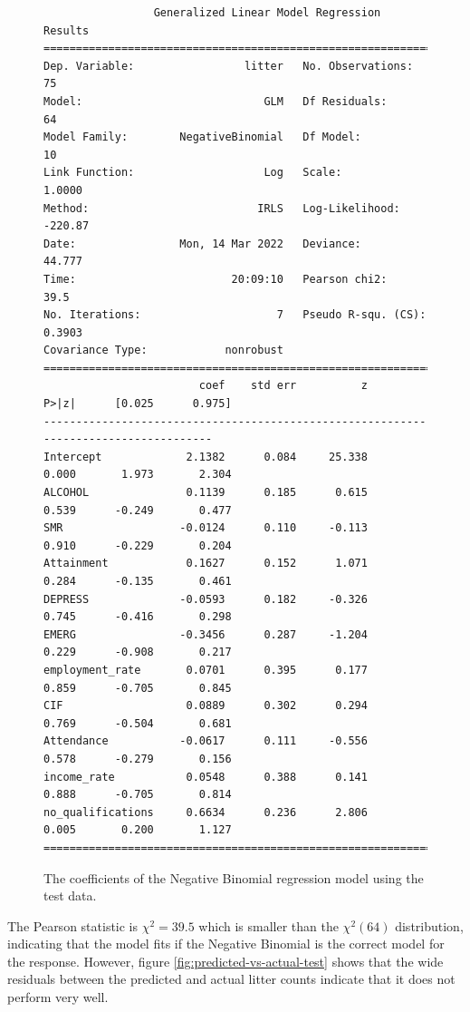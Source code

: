 \documentclass{thesis}
\begin{document}
\begin{figure}[h]
    \centering
\footnotesize
\begin{verbatim}
                 Generalized Linear Model Regression Results                  
==============================================================================
Dep. Variable:                 litter   No. Observations:                   75
Model:                            GLM   Df Residuals:                       64
Model Family:        NegativeBinomial   Df Model:                           10
Link Function:                    Log   Scale:                          1.0000
Method:                          IRLS   Log-Likelihood:                -220.87
Date:                Mon, 14 Mar 2022   Deviance:                       44.777
Time:                        20:09:10   Pearson chi2:                     39.5
No. Iterations:                     7   Pseudo R-squ. (CS):             0.3903
Covariance Type:            nonrobust                                         
=====================================================================================
                        coef    std err          z      P>|z|      [0.025      0.975]
-------------------------------------------------------------------------------------
Intercept             2.1382      0.084     25.338      0.000       1.973       2.304
ALCOHOL               0.1139      0.185      0.615      0.539      -0.249       0.477
SMR                  -0.0124      0.110     -0.113      0.910      -0.229       0.204
Attainment            0.1627      0.152      1.071      0.284      -0.135       0.461
DEPRESS              -0.0593      0.182     -0.326      0.745      -0.416       0.298
EMERG                -0.3456      0.287     -1.204      0.229      -0.908       0.217
employment_rate       0.0701      0.395      0.177      0.859      -0.705       0.845
CIF                   0.0889      0.302      0.294      0.769      -0.504       0.681
Attendance           -0.0617      0.111     -0.556      0.578      -0.279       0.156
income_rate           0.0548      0.388      0.141      0.888      -0.705       0.814
no_qualifications     0.6634      0.236      2.806      0.005       0.200       1.127
=====================================================================================
\end{verbatim}
\normalsize
    \caption{The coefficients of the Negative Binomial regression model using the test data.}
    \label{fig:nb-coeff-test}
\end{figure}

The Pearson statistic is $\chi^2 = 39.5$ which is smaller than the $\chi^2(64)$ distribution, indicating that the model fits if the Negative Binomial is the correct model for the response. However, figure \ref{fig:predicted-vs-actual-test} shows that the wide residuals between the predicted and actual litter counts indicate that it does not perform very well.
\end{document}

